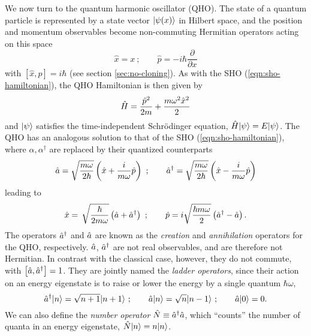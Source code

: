 We now turn to the quantum harmonic oscillator (QHO).
The state of a quantum particle is represented by a state vector $\mbox{$ | \psi(x) \rangle $}$ in Hilbert space, and the position and momentum observables become non-commuting Hermitian operators acting on this space
\begin{equation}
\hat{x} = x ~; \qquad \hat{p} = -i \hbar \frac{\partial } { \partial x} 
\end{equation}
with $\left[\hat{x}, \hat{p}\right] = i\hbar$ (see section \ref{sec:no-cloning}). 
%
%
%
As with the SHO (\ref{eqn:sho-hamiltonian}), the QHO Hamiltonian is then  given by
\begin{equation}
    \hat{H} = \frac{\hat{p}^2}{2m} + \frac{m\omega^2 \hat{x}^2}{2}
    \label{eqn:qho-hamiltonian}
\end{equation}
and $\mbox{$ | \psi \rangle $}$ satisfies the time-independent Schr\"odinger equation, $\hat{H} \mbox{$ | \psi \rangle $} = E\mbox{$ | \psi \rangle $}$.
The QHO has an analogous solution to that of the SHO (\ref{eqn:sho-hamiltonian}), where $\alpha, \alpha^\dagger$ are replaced by their quantized counterparts
\begin{equation}
  \hat{a} = \sqrt{\frac{m\omega}{2\hbar}}\left(\hat{x}+\frac{i}{m\omega}\hat{p}\right)
  ~;\qquad
  \hat{a}^{\dagger} = \sqrt{\frac{m\omega}{2\hbar}}\left(\hat{x}-\frac{i}{m\omega}\hat{p}\right)
\end{equation}
leading to
\begin{equation}
   \hat{x} = \, \sqrt{\frac{\hbar}{2m\omega}} 
   \left( \hat{a} + \hat{a}^{\dagger} \right) ~;\qquad
   \hat{p} = i \sqrt{\frac{\hbar m \omega}{2}} 
   \left( \hat{a}^{\dagger} - \hat{a} \right) 
   \label{eqn:creation-annihilation-def}.
\end{equation}
The operators $\hat{a}^{\dagger}$ and $\hat{a}$ are known as the \emph{creation} and \emph{annihilation} operators for the QHO, respectively. $\hat{a}$, $\hat{a}^{\dagger}$ are not real observables, and are therefore not Hermitian. In contrast with the classical case, however, they do not commute, with $\left[\hat{a}, \hat{a}^{\dagger}\right] = 1$. They are jointly named the \emph{ladder operators}, since their action on an energy eigenstate is to raise or lower the energy by a single quantum $\hbar \omega$, 
\begin{equation}
   \hat{a}^{\dagger} \mbox{$ | n \rangle $} = \sqrt{n+1} \mbox{$ | n+1 \rangle $} ~; \qquad
   \hat{a} \mbox{$ | n \rangle $} = \sqrt{n} \mbox{$ | n-1 \rangle $} ~; \qquad
   \hat{a} \mbox{$ | 0 \rangle $} = 0.
   \label{eqn:ladder-action}
\end{equation}
We can also define the \emph{number operator} $\hat{N} \equiv \hat{a}^{\dagger} \hat{a}$, which ``counts'' the number of quanta in an energy eigenstate, $\hat{N} \mbox{$ | n \rangle $} = n \mbox{$ | n \rangle $}$.


